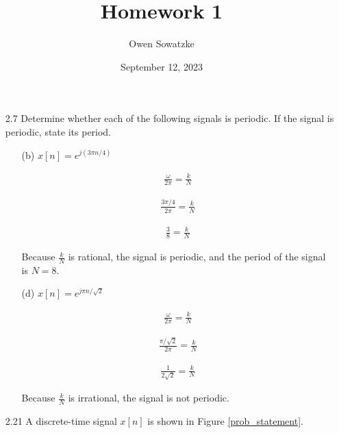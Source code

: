 \documentclass[fleqn]{article}
\title{Homework 1}
\author{Owen Sowatzke}
\date{September 12, 2023}
\begin{document}
	\setlength{\abovedisplayskip}{0pt}
	\setlength{\belowdisplayskip}{0pt}
	\setlength{\abovedisplayshortskip}{0pt}
	\setlength{\belowdisplayshortskip}{0pt}
	\setlength{\mathindent}{0pt}
	\doublespacing
	\maketitle
	
	\begin{enumerate}[nolistsep]
	
		\item[2.7] Determine whether each of the following signals is periodic. If the signal is periodic, state its period.
		
		\begin{enumerate}[nolistsep]
			
			\item[(b)] $x[n] = e^{j({3\pi}n/4)}$
			
			\begin{align*}
			\frac{\omega}{2\pi} = \frac{k}{N}
			\end{align*}
			
			\begin{align*}
			\frac{3\pi/4}{2\pi} = \frac{k}{N}
			\end{align*}
			
			\begin{align*}
			\frac{3}{8} = \frac{k}{N}
			\end{align*}
			
			Because $\frac{k}{N}$ is rational, the signal is periodic, and the period of the signal is $N = 8$.
			
			\item[(d)] $x[n] = e^{j{\pi}n/\sqrt{2}}$
			
			\begin{align*}
			\frac{\omega}{2\pi} = \frac{k}{N}
			\end{align*}
			
			\begin{align*}
			\frac{\pi/\sqrt{2}}{2\pi} = \frac{k}{N}
			\end{align*}
			
			\begin{align*}
			\frac{1}{2\sqrt{2}} = \frac{k}{N}
			\end{align*}
			
			Because $\frac{k}{N}$ is irrational, the signal is not periodic.
			
		\end{enumerate}
		\item[2.21] A discrete-time signal $x[n]$ is shown in Figure \ref{prob_statement}.
		

\end{enumerate}
\end{document}

